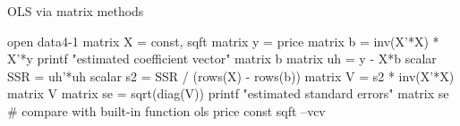 \begin{script}[htbp]
  \caption{OLS via matrix methods}
  \label{examp-matrix}
\begin{code}
  open data4-1
  matrix X = { const, sqft }
  matrix y = { price }
  matrix b = inv(X'*X) * X'*y
  printf "estimated coefficient vector\n"
  matrix b
  matrix uh = y - X*b
  scalar SSR = uh'*uh
  scalar s2 = SSR / (rows(X) - rows(b))
  matrix V = s2 * inv(X'*X)
  matrix V
  matrix se = sqrt(diag(V))
  printf "estimated standard errors\n"
  matrix se
  # compare with built-in function
  ols price const sqft --vcv
\end{code}
\end{script}



















